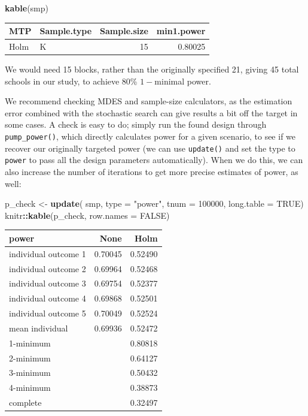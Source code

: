 \documentclass[
]{article}
\newenvironment{Shaded}{\begin{snugshade}}{\end{snugshade}}
\newcommand{\DataTypeTok}[1]{\textcolor[rgb]{0.13,0.29,0.53}{#1}}
\newcommand{\DecValTok}[1]{\textcolor[rgb]{0.00,0.00,0.81}{#1}}
\newcommand{\KeywordTok}[1]{\textcolor[rgb]{0.13,0.29,0.53}{\textbf{#1}}}
\newcommand{\NormalTok}[1]{#1}
\newcommand{\OperatorTok}[1]{\textcolor[rgb]{0.81,0.36,0.00}{\textbf{#1}}}
\newcommand{\OtherTok}[1]{\textcolor[rgb]{0.56,0.35,0.01}{#1}}
\newcommand{\StringTok}[1]{\textcolor[rgb]{0.31,0.60,0.02}{#1}}
\begin{document}
\begin{Shaded}
\begin{Highlighting}[]
\KeywordTok{kable}\NormalTok{(smp)}
\end{Highlighting}
\end{Shaded}

\begin{tabular}{l|l|r|r}
\hline
MTP & Sample.type & Sample.size & min1.power\\
\hline
Holm & K & 15 & 0.80025\\
\hline
\end{tabular}

We would need 15 blocks, rather than the originally specified 21, giving
45 total schools in our study, to achieve 80\% \(1-\)minimal power.

We recommend checking MDES and sample-size calculators, as the
estimation error combined with the stochastic search can give results a
bit off the target in some cases. A check is easy to do; simply run the
found design through \texttt{pump\_power()}, which directly calculates
power for a given scenario, to see if we recover our originally targeted
power (we can use \texttt{update()} and set the type to \texttt{power}
to pass all the design parameters automatically). When we do this, we
can also increase the number of iterations to get more precise estimates
of power, as well:

\begin{Shaded}
\begin{Highlighting}[]
\NormalTok{p\_check \textless{}{-}}\StringTok{ }\KeywordTok{update}\NormalTok{( smp, }\DataTypeTok{type =} \StringTok{"power"}\NormalTok{, }\DataTypeTok{tnum =} \DecValTok{100000}\NormalTok{,}
                   \DataTypeTok{long.table =} \OtherTok{TRUE}\NormalTok{)}
\NormalTok{knitr}\OperatorTok{::}\KeywordTok{kable}\NormalTok{(p\_check, }\DataTypeTok{row.names =} \OtherTok{FALSE}\NormalTok{)}
\end{Highlighting}
\end{Shaded}

\begin{tabular}{l|r|r}
\hline
power & None & Holm\\
\hline
individual outcome 1 & 0.70045 & 0.52490\\
\hline
individual outcome 2 & 0.69964 & 0.52468\\
\hline
individual outcome 3 & 0.69754 & 0.52377\\
\hline
individual outcome 4 & 0.69868 & 0.52501\\
\hline
individual outcome 5 & 0.70049 & 0.52524\\
\hline
mean individual & 0.69936 & 0.52472\\
\hline
1-minimum &  & 0.80818\\
\hline
2-minimum &  & 0.64127\\
\hline
3-minimum &  & 0.50432\\
\hline
4-minimum &  & 0.38873\\
\hline
complete &  & 0.32497\\
\hline
\end{tabular}
\end{document}
